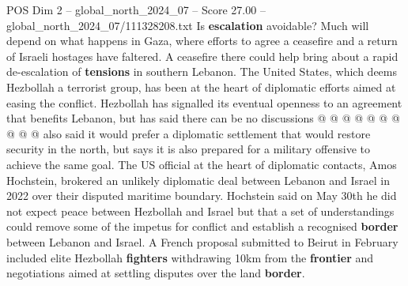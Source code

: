 \begin{textsample}{POS Dim 2 – global\_north\_2024\_07 – Score 27.00 – global\_north\_2024\_07/111328208.txt}
Is \textbf{escalation} avoidable?
Much will depend on what happens in Gaza, where efforts to agree a ceasefire and a return of Israeli hostages have faltered.
A ceasefire there could help bring about a rapid de-escalation of \textbf{tensions} in southern Lebanon.
The United States, which deems Hezbollah a terrorist group, has been at the heart of diplomatic efforts aimed at easing the conflict.
Hezbollah has signalled its eventual openness to an agreement that benefits Lebanon, but has said there can be no discussions @ @ @ @ @ @ @ @ @ @ also said it would prefer a diplomatic settlement that would restore security in the north, but says it is also prepared for a military offensive to achieve the same goal.
The US official at the heart of diplomatic contacts, Amos Hochstein, brokered an unlikely diplomatic deal between Lebanon and Israel in 2022 over their disputed maritime boundary.
Hochstein said on May 30th he did not expect peace between Hezbollah and Israel but that a set of understandings could remove some of the impetus for conflict and establish a recognised \textbf{border} between Lebanon and Israel.
A French proposal submitted to Beirut in February included elite Hezbollah \textbf{fighters} withdrawing 10km from the \textbf{frontier} and negotiations aimed at settling disputes over the land \textbf{border}.

\end{textsample}

